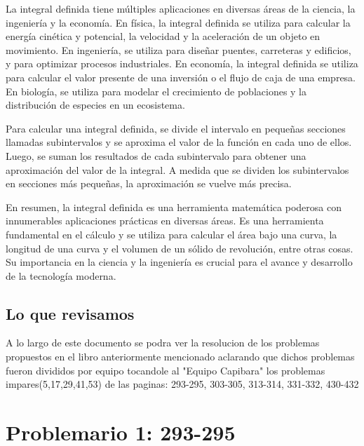 \documentclass{article}
\begin{document}
La integral definida tiene múltiples aplicaciones en diversas áreas de la ciencia, la ingeniería y la economía. En física, la integral definida se utiliza para calcular la energía cinética y potencial, la velocidad y la aceleración de un objeto en movimiento. En ingeniería, se utiliza para diseñar puentes, carreteras y edificios, y para optimizar procesos industriales. En economía, la integral definida se utiliza para calcular el valor presente de una inversión o el flujo de caja de una empresa. En biología, se utiliza para modelar el crecimiento de poblaciones y la distribución de especies en un ecosistema.

Para calcular una integral definida, se divide el intervalo en pequeñas secciones llamadas subintervalos y se aproxima el valor de la función en cada uno de ellos. Luego, se suman los resultados de cada subintervalo para obtener una aproximación del valor de la integral. A medida que se dividen los subintervalos en secciones más pequeñas, la aproximación se vuelve más precisa.

En resumen, la integral definida es una herramienta matemática poderosa con innumerables aplicaciones prácticas en diversas áreas. Es una herramienta fundamental en el cálculo y se utiliza para calcular el área bajo una curva, la longitud de una curva y el volumen de un sólido de revolución, entre otras cosas. Su importancia en la ciencia y la ingeniería es crucial para el avance y desarrollo de la tecnología moderna.
\subsection{Lo que revisamos}
A lo largo de este documento se podra ver la resolucion de los problemas propuestos en el libro anteriormente mencionado aclarando que dichos problemas fueron divididos por equipo tocandole al "Equipo Capibara" los problemas impares(5,17,29,41,53) de las paginas: 293-295, 303-305, 313-314, 331-332, 430-432
\section{Problemario 1: 293-295}
\end{document}
